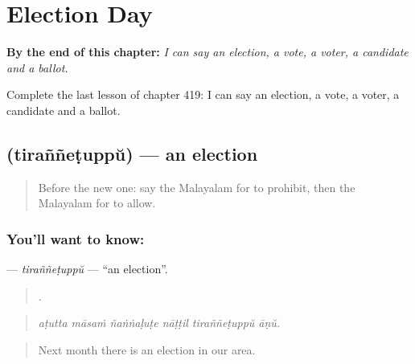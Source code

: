 
\chapter{Election Day}
\label{ch:ml-election-day}

\begin{chapteropening}
\textbf{By the end of this chapter:} \emph{I can say an election, a vote, a voter, a candidate and a ballot.}

Complete the last lesson of chapter 419: I can say an election, a vote, a voter, a candidate and a ballot.
\end{chapteropening}

\section[\texorpdfstring{\ml{തിരഞ്ഞെടുപ്പ്} (tiraññeṭuppŭ)}{തിരഞ്ഞെടുപ്പ് (tiraññeṭuppŭ)}]{ (tiraññeṭuppŭ) — an election}

\label{lesson:ML-C419-tirannetuppu}



\begin{quote}
Before the new one: say the Malayalam for to prohibit, then the Malayalam for to allow.
\end{quote}

\subsection*{You'll want to know: }
\textbf{} — \emph{tiraññeṭuppŭ} — \textquotedblleft{}an election\textquotedblright{}.

\begin{quote}
     .
\end{quote}

\begin{quote}
\emph{aṭutta māsaṁ ñaṅṅaḷuṭe nāṭṭil tiraññeṭuppŭ āṇŭ.}
\end{quote}

\begin{quote}
Next month there is an election in our area.
\end{quote}

